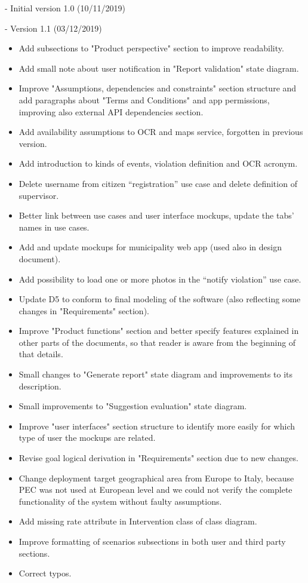 - Initial version 1.0 (10/11/2019)

- Version 1.1 (03/12/2019)
\begin{itemize}
	\item Add subsections to "Product perspective" section to improve readability.
	\item Add small note about user notification in "Report validation" state diagram. 
	\item Improve "Assumptions, dependencies and constraints" section structure and add paragraphs about "Terms and Conditions" and app permissions, improving also external API dependencies section.
	\item Add availability assumptions to OCR and maps service, forgotten in previous version.
	\item Add introduction to kinds of events, violation definition and OCR acronym.
	\item Delete username from citizen “registration” use case and delete definition of supervisor.
	\item Better link between use cases and user interface mockups, update the tabs’ names in use cases.
	\item Add and update mockups for municipality web app (used also in design document).
	\item Add possibility to load one or more photos in the “notify violation” use case.
	\item Update D5 to conform to final modeling of the software (also reflecting some changes in "Requirements" section).
	\item Improve "Product functions" section and better specify features explained in other parts of the documents, so that reader is aware from the beginning of that details.
	\item Small changes to "Generate report" state diagram and improvements to its description.
	\item Small improvements to "Suggestion evaluation" state diagram.
	\item Improve "user interfaces" section structure to identify more easily for which type of user the mockups are related.
	\item Revise goal logical derivation in "Requirements" section due to new changes.
	\item Change deployment target geographical area from Europe to Italy, because PEC was not used at European level and we could not verify the complete functionality of the system without faulty assumptions.  
	\item Add missing rate attribute in Intervention class of class diagram.
	\item Improve formatting of scenarios subsections in both user and third party sections.
	\item Correct typos.
\end{itemize}
